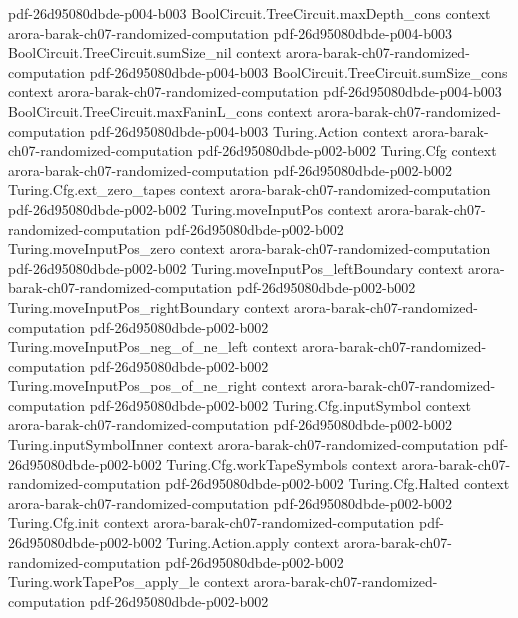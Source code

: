 \begin{theorem}
  {pdf-26d95080dbde-p004-b003}
\proofstep
  {BoolCircuit.TreeCircuit.maxDepth_cons}
  {context}
  {arora-barak-ch07-randomized-computation}
  {pdf-26d95080dbde-p004-b003}
\proofstep
  {BoolCircuit.TreeCircuit.sumSize_nil}
  {context}
  {arora-barak-ch07-randomized-computation}
  {pdf-26d95080dbde-p004-b003}
\proofstep
  {BoolCircuit.TreeCircuit.sumSize_cons}
  {context}
  {arora-barak-ch07-randomized-computation}
  {pdf-26d95080dbde-p004-b003}
\proofstep
  {BoolCircuit.TreeCircuit.maxFaninL_cons}
  {context}
  {arora-barak-ch07-randomized-computation}
  {pdf-26d95080dbde-p004-b003}
\proofstep
  {Turing.Action}
  {context}
  {arora-barak-ch07-randomized-computation}
  {pdf-26d95080dbde-p002-b002}
\proofstep
  {Turing.Cfg}
  {context}
  {arora-barak-ch07-randomized-computation}
  {pdf-26d95080dbde-p002-b002}
\proofstep
  {Turing.Cfg.ext_zero_tapes}
  {context}
  {arora-barak-ch07-randomized-computation}
  {pdf-26d95080dbde-p002-b002}
\proofstep
  {Turing.moveInputPos}
  {context}
  {arora-barak-ch07-randomized-computation}
  {pdf-26d95080dbde-p002-b002}
\proofstep
  {Turing.moveInputPos_zero}
  {context}
  {arora-barak-ch07-randomized-computation}
  {pdf-26d95080dbde-p002-b002}
\proofstep
  {Turing.moveInputPos_leftBoundary}
  {context}
  {arora-barak-ch07-randomized-computation}
  {pdf-26d95080dbde-p002-b002}
\proofstep
  {Turing.moveInputPos_rightBoundary}
  {context}
  {arora-barak-ch07-randomized-computation}
  {pdf-26d95080dbde-p002-b002}
\proofstep
  {Turing.moveInputPos_neg_of_ne_left}
  {context}
  {arora-barak-ch07-randomized-computation}
  {pdf-26d95080dbde-p002-b002}
\proofstep
  {Turing.moveInputPos_pos_of_ne_right}
  {context}
  {arora-barak-ch07-randomized-computation}
  {pdf-26d95080dbde-p002-b002}
\proofstep
  {Turing.Cfg.inputSymbol}
  {context}
  {arora-barak-ch07-randomized-computation}
  {pdf-26d95080dbde-p002-b002}
\proofstep
  {Turing.inputSymbolInner}
  {context}
  {arora-barak-ch07-randomized-computation}
  {pdf-26d95080dbde-p002-b002}
\proofstep
  {Turing.Cfg.workTapeSymbols}
  {context}
  {arora-barak-ch07-randomized-computation}
  {pdf-26d95080dbde-p002-b002}
\proofstep
  {Turing.Cfg.Halted}
  {context}
  {arora-barak-ch07-randomized-computation}
  {pdf-26d95080dbde-p002-b002}
\proofstep
  {Turing.Cfg.init}
  {context}
  {arora-barak-ch07-randomized-computation}
  {pdf-26d95080dbde-p002-b002}
\proofstep
  {Turing.Action.apply}
  {context}
  {arora-barak-ch07-randomized-computation}
  {pdf-26d95080dbde-p002-b002}
\proofstep
  {Turing.workTapePos_apply_le}
  {context}
  {arora-barak-ch07-randomized-computation}
  {pdf-26d95080dbde-p002-b002}

\end{theorem}
